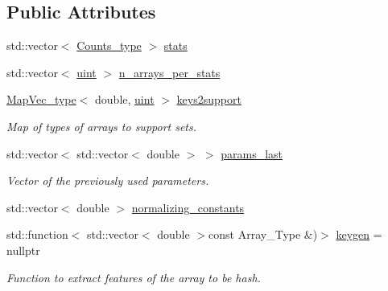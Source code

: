 \subsection*{Public Attributes}
\begin{DoxyCompactItemize}
\item 
std\+::vector$<$ \hyperlink{typedefs_8hpp_aee40fa17c1fddb63dd1f2b1470ade95b}{Counts\+\_\+type} $>$ \hyperlink{class_model_a1816b0dd69226394643dc31916c8645e}{stats}
\item 
std\+::vector$<$ \hyperlink{typedefs_8hpp_a91ad9478d81a7aaf2593e8d9c3d06a14}{uint} $>$ \hyperlink{class_model_ab43351423d375b537a1a6a497c65caa1}{n\+\_\+arrays\+\_\+per\+\_\+stats}
\item 
\hyperlink{typedefs_8hpp_a02ed8dec96bc528c8bc3d8cb3c4674a5}{Map\+Vec\+\_\+type}$<$ double, \hyperlink{typedefs_8hpp_a91ad9478d81a7aaf2593e8d9c3d06a14}{uint} $>$ \hyperlink{class_model_a83d72b83e29ccaf09a5a05d2a67d0f05}{keys2support}
\begin{DoxyCompactList}\small\item\em Map of types of arrays to support sets. \end{DoxyCompactList}\item 
std\+::vector$<$ std\+::vector$<$ double $>$ $>$ \hyperlink{class_model_a627aaec1fe2c0e25546f68da78b0c00b}{params\+\_\+last}
\begin{DoxyCompactList}\small\item\em Vector of the previously used parameters. \end{DoxyCompactList}\item 
std\+::vector$<$ double $>$ \hyperlink{class_model_ad4ec6d7a19e7a47fb6ffabbf191e1877}{normalizing\+\_\+constants}
\item 
std\+::function$<$ std\+::vector$<$ double $>$const Array\+\_\+\+Type \&)$>$ \hyperlink{class_model_a087db7c5e2ee47f4353d2e181223dd5a}{keygen} = nullptr
\begin{DoxyCompactList}\small\item\em Function to extract features of the array to be hash. \end{DoxyCompactList}\end{DoxyCompactItemize}
